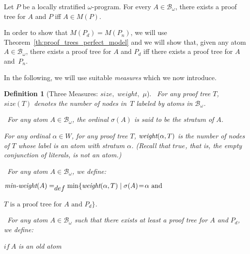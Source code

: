 \documentclass[english]{tlp}
\newtheorem{definition}{Definition} \newtheorem{example}{Example}       \newtheorem{remark}{Remark}
\renewcommand{\mathit}{\displaystyle}
\begin{document}
\begin{theorem} \label{th:proof_trees_perfect_model}  Let \( P \) be a
locally stratified $\omega$-program. For every \(
A\in\mathcal{B}_{\omega} \), there exists a proof tree for \( A \)
and \( P \) iff \( A\in M(P) \).
\end{theorem}

In order to show that $M(P_d) = M(P_n)$, we will use
Theorem~\ref{th:proof_trees_perfect_model} and we will show that,
given any atom \( A \in\mathcal{B}_{\omega}\), there exists a proof
tree for \( A \) and \( P_{d} \) iff there exists a proof tree for
\( A \) and~\( P_n\). 

\smallskip
In the following, we will use suitable \emph{measures} which we now introduce.

\begin{definition}[Three Measures: $\mathit{size},$ $\mathit{weight},$ $\mu$] 
\label{def:measure} ~For any proof tree $T$, $\mathit{size}(T)$
denotes the number of nodes in~\( T \) labeled by atoms in
$\mathcal{B}_{\omega}$.

~For any atom $A\in \mathcal{B}_{\omega}$, the ordinal $\sigma(A)$ is said 
to be the {\em{stratum}} of $A$. 

\hangindent=7mm\hspace{3mm}For any ordinal $\alpha\in W$, for any proof tree $T$,
$\mbox{\it weight}(\alpha,T)$ is the number of nodes 
of $T$ whose label is an atom with stratum $\alpha$.
{\rm{(}}Recall that $\mathit{true}$, that is,
the empty conjunction of literals, is {\it{not}} an atom.{\rm{)}}





~For any atom \(A\in\mathcal{B}_{\omega} \), we
define\/{\rm{:}}

\smallskip

\hspace*{8mm}$\mbox{\it min-weight}(A) =_{\mathit{def}} \min \{\mbox{\it
weight}(\alpha,T) \mid \sigma(A)\!=\!\alpha \mbox{~and~}$

\makebox[69mm][l]{}$T \mbox{ is a proof tree for $A$ and } P_d\}$.

\smallskip

~For any atom \(A\in\mathcal{B}_{\omega} \) such that 
 there exists at least a proof tree for $A$ and $P_d$, we
define\/{\rm{:}}
\smallskip{}

\hspace*{8mm}\makebox[18mm][l]{$ \mu (A)=_{\mathit{def}}$}
  ${\mathit{if}}~A$ is an old atom


\end{definition}
\end{document}
